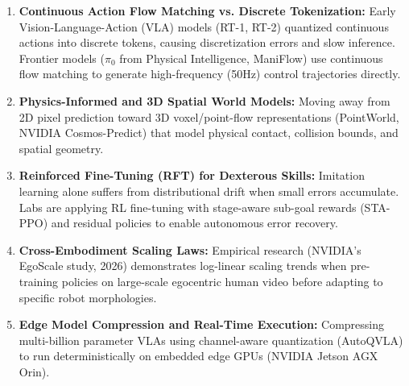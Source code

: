 \documentclass[11pt,a4paper]{article}
\begin{document}
\begin{enumerate}
    \item \textbf{Continuous Action Flow Matching vs. Discrete Tokenization:}
    Early Vision-Language-Action (VLA) models (RT-1, RT-2) quantized continuous actions into discrete tokens, causing discretization errors and slow inference. Frontier models ($\pi_0$ from Physical Intelligence, ManiFlow) use continuous flow matching to generate high-frequency (50Hz) control trajectories directly.
    \item \textbf{Physics-Informed and 3D Spatial World Models:}
    Moving away from 2D pixel prediction toward 3D voxel/point-flow representations (PointWorld, NVIDIA Cosmos-Predict) that model physical contact, collision bounds, and spatial geometry.
    \item \textbf{Reinforced Fine-Tuning (RFT) for Dexterous Skills:}
    Imitation learning alone suffers from distributional drift when small errors accumulate. Labs are applying RL fine-tuning with stage-aware sub-goal rewards (STA-PPO) and residual policies to enable autonomous error recovery.
    \item \textbf{Cross-Embodiment Scaling Laws:}
    Empirical research (NVIDIA's EgoScale study, 2026) demonstrates log-linear scaling trends when pre-training policies on large-scale egocentric human video before adapting to specific robot morphologies.
    \item \textbf{Edge Model Compression and Real-Time Execution:}
    Compressing multi-billion parameter VLAs using channel-aware quantization (AutoQVLA) to run deterministically on embedded edge GPUs (NVIDIA Jetson AGX Orin).
\end{enumerate}
\end{document}
